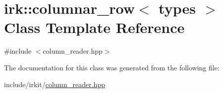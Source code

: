 \hypertarget{classirk_1_1columnar__row}{}\section{irk\+:\+:columnar\+\_\+row$<$ types $>$ Class Template Reference}
\label{classirk_1_1columnar__row}


{\ttfamily \#include $<$column\+\_\+reader.\+hpp$>$}



The documentation for this class was generated from the following file\+:\begin{DoxyCompactItemize}
\item 
include/irkit/\mbox{\hyperlink{column__reader_8hpp}{column\+\_\+reader.\+hpp}}\end{DoxyCompactItemize}
